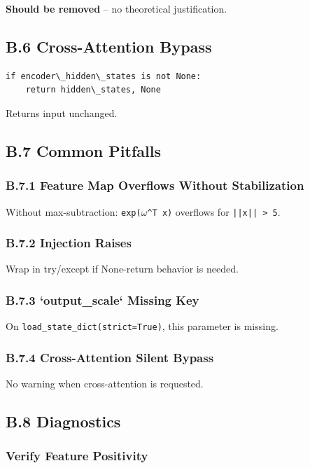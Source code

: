 \textbf{Should be removed} -- no theoretical justification.

\subsection{B.6 Cross-Attention Bypass}

\begin{lstlisting}
if encoder\_hidden\_states is not None:
    return hidden\_states, None
\end{lstlisting}

Returns input unchanged.

\subsection{B.7 Common Pitfalls}

\subsubsection{B.7.1 Feature Map Overflows Without Stabilization}

Without max-subtraction: \texttt{exp($\omega$^T x)} overflows for \texttt{||x|| \textgreater{} 5}.

\subsubsection{B.7.2 Injection Raises}

Wrap in try/except if None-return behavior is needed.

\subsubsection{B.7.3 `output\_scale` Missing Key}

On \texttt{load\_state\_dict(strict=True)}, this parameter is missing.

\subsubsection{B.7.4 Cross-Attention Silent Bypass}

No warning when cross-attention is requested.

\subsection{B.8 Diagnostics}

\subsubsection{Verify Feature Positivity}

